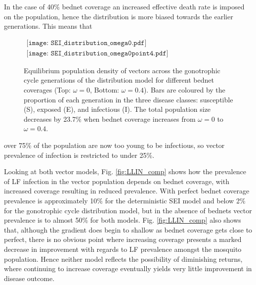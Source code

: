 \documentclass[5p,times]{elsarticle}
\begin{document}
In the case of 40\% bednet coverage an increased effective death rate is imposed on the population, hence the distribution is more biased towards the earlier generations. This means that \begin{figure}[h]
\begin{center}$
\begin{array}{c}
\texttt{[image: SEI\_distribution\_omega0.pdf]}\\
\texttt{[image: SEI\_distribution\_omega0point4.pdf]}
\end{array}$
\caption{Equilibrium population density of vectors across the gonotrophic cycle generations of the distribution model for different bednet coverages (Top: $\omega=0$, Bottom: $\omega=0.4$). Bars are coloured by the proportion of each generation in the three disease classes: susceptible (S), exposed (E), and infectious (I). The total population size decreases by 23.7\% when bednet coverage increases from $\omega=0$ to $\omega=0.4$.}
\label{fig:SEIdist}
\end{center}
\end{figure} over 75\% of the population are now too young to be infectious, so vector prevalence of infection is restricted to under 25\%.

Looking at both vector models, Fig. \ref{fig:LLIN_comp} shows how the prevalence of LF infection in the vector population depends on bednet coverage, with increased coverage resulting in reduced prevalence. With perfect bednet coverage prevalence is approximately 10\% for the deterministic SEI model and below 2\% for the gonotrophic cycle distribution model, but in the absence of bednets vector prevalence is to almost 50\% for both models. Fig. \ref{fig:LLIN_comp} also shows that, although the gradient does begin to shallow as bednet coverage gets close to perfect, there is no obvious point where increasing coverage presents a marked decrease in improvement with regards to LF prevalence amongst the mosquito population. Hence neither model reflects the possibility of diminishing returns, where continuing to increase coverage eventually yields very little improvement in disease outcome.
\end{document}
